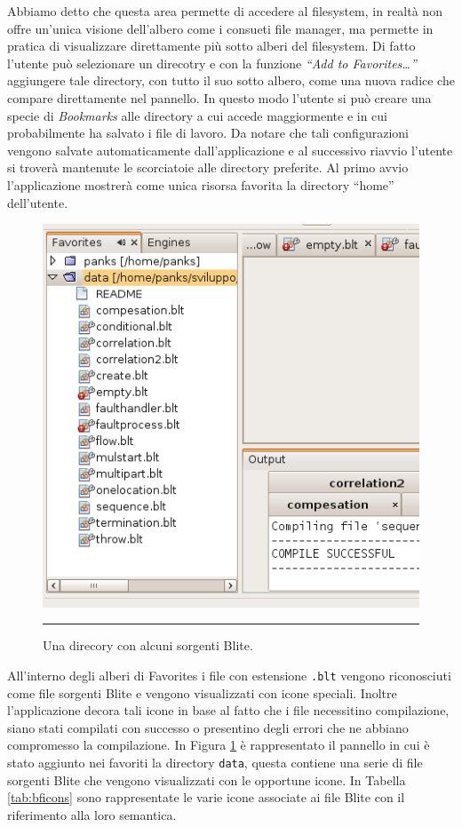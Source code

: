 Abbiamo detto che questa area permette di accedere al filesystem, in realtà
non offre un'unica visione dell'albero come i consueti file manager, ma
permette in pratica di visualizzare direttamente più sotto alberi del
filesystem. Di fatto l'utente può selezionare un direcotry e con la funzione \emph{``Add to
Favorites\ldots''} aggiungere tale directory, con tutto il suo sotto albero,
come una nuova radice che compare direttamente nel pannello. In questo modo l'utente
si può creare una specie di \emph{Bookmarks} alle directory a cui accede
maggiormente e in cui probabilmente ha salvato i file di lavoro. Da notare che
tali configurazioni vengono salvate automaticamente dall'applicazione e al
successivo riavvio l'utente si troverà mantenute le scorciatoie alle directory
preferite. Al primo avvio l'applicazione mostrerà come unica risorsa favorita
la directory ``home'' dell'utente.

\begin{figure}[h]
\begin{center}
\includegraphics[scale=0.65]
{blide/dia/BlideFavo}
\caption[Il pannello ``Favorites'']{Una direcory con alcuni sorgenti Blite.}
\rule{7cm}{0.01cm}
  \label{fig:blideFavo}
\end{center}
\end{figure}

All'interno degli alberi di Favorites i file con estensione
\texttt{.blt} vengono riconosciuti come file sorgenti Blite e vengono
visualizzati con icone speciali. Inoltre l'applicazione decora tali icone in
base al fatto che i file necessitino compilazione, siano stati compilati con
successo o presentino degli errori che ne abbiano compromesso la compilazione.
In Figura \ref{fig:blideFavo} è rappresentato il pannello in cui è stato aggiunto nei
favoriti la directory \texttt{data}, questa contiene una serie di file sorgenti
Blite che vengono visualizzati con le opportune icone. In Tabella
\ref{tab:bficons} sono rappresentate le varie icone associate ai file Blite con
il riferimento alla loro semantica.
\\


